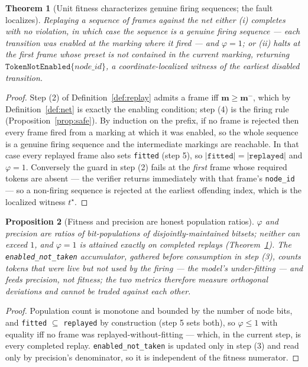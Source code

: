 \documentclass[11pt,oneside]{book}
\theoremstyle{definition}
\theoremstyle{plain}
\newtheorem{theorem}{Theorem}[chapter]
\newtheorem{proposition}[theorem]{Proposition}
\theoremstyle{remark}
\newcommand{\Fitness}{\varphi}
\newcommand{\code}[1]{\texttt{#1}}
\begin{document}
\begin{theorem}[Unit fitness characterizes genuine firing sequences; the fault localizes]\label{thm:fitness}
Replaying a sequence of frames against the net either (i) completes with no violation, in which
case the sequence is a genuine firing sequence --- each transition was enabled at the marking
where it fired --- and $\Fitness=1$; or (ii) halts at the first frame whose preset is not
contained in the current marking, returning $\code{TokenNotEnabled}\{node\_id\}$, a
coordinate-localized witness of the earliest disabled transition.
\end{theorem}

\begin{proof}
Step (2) of Definition~\ref{def:replay} admits a frame iff $\bm m\ge\bm m^{-}$, which by
Definition~\ref{def:net} is exactly the enabling condition; step (4) is the firing rule
(Proposition~\ref{prop:safe}). By induction on the prefix, if no frame is rejected then every
frame fired from a marking at which it was enabled, so the whole sequence is a genuine firing
sequence and the intermediate markings are reachable. In that case every replayed frame also
sets \code{fitted} (step 5), so $|\code{fitted}|=|\code{replayed}|$ and
$\Fitness=1$. Conversely the guard in step (2) fails at the \emph{first} frame whose
required tokens are absent --- the verifier returns immediately with that frame's
\code{node\_id} --- so a non-firing sequence is rejected at the earliest offending index, which
is the localized witness $t^{\star}$. \end{proof}

\begin{proposition}[Fitness and precision are honest population ratios]\label{prop:honest}
$\Fitness$ and precision are ratios of bit-populations of disjointly-maintained bitsets;
neither can exceed $1$, and $\Fitness=1$ is attained exactly on completed replays
(Theorem~\ref{thm:fitness}). The \code{enabled\_not\_taken} accumulator, gathered
\emph{before} consumption in step (3), counts tokens that were live but not used by the firing
--- the model's under-fitting --- and feeds precision, not fitness; the two metrics therefore
measure orthogonal deviations and cannot be traded against each other.
\end{proposition}

\begin{proof}
Population count is monotone and bounded by the number of node bits, and \code{fitted}
$\subseteq$ \code{replayed} by construction (step 5 sets both), so $\Fitness\le 1$ with
equality iff no frame was replayed-without-fitting --- which, in the current step, is every
completed replay. \code{enabled\_not\_taken} is updated only in step (3) and read only by
precision's denominator, so it is independent of the fitness numerator. \end{proof}
\end{document}
